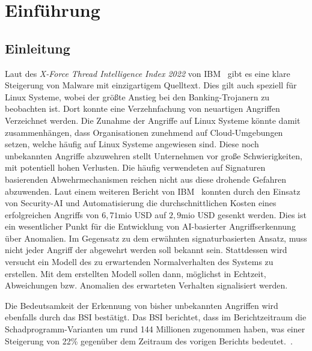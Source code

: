 \chapter{Einführung}\label{ch:introduction} %
\section{Einleitung}\label{sec:einleitung}
Laut des \textit{X-Force Thread Intelligence Index 2022} von IBM~\cite{IBM} gibt es eine klare Steigerung von Malware mit einzigartigem Quelltext.
Dies gilt auch speziell für Linux Systeme, wobei der größte Anstieg bei den Banking-Trojanern zu beobachten ist.
Dort konnte eine Verzehnfachung von neuartigen Angriffen Verzeichnet werden.
Die Zunahme der Angriffe auf Linux Systeme könnte damit zusammenhängen, dass Organisationen zunehmend auf Cloud-Umgebungen setzen, welche häufig auf Linux Systeme angewiesen sind.
Diese noch unbekannten Angriffe abzuwehren stellt Unternehmen vor große Schwierigkeiten, mit potentiell hohen Verlusten.
Die häufig verwendeten auf Signaturen basierenden Abwehrmechanismen reichen nicht aus diese drohende Gefahren abzuwenden.
Laut einem weiteren Bericht von IBM~\cite{IBM2} konnten durch den Einsatz von Security-\ac{AI} und Automatisierung die durchschnittlichen Kosten eines erfolgreichen Angriffs von $6,71$mio USD auf $2,9$mio USD gesenkt werden.
Dies ist ein wesentlicher Punkt für die Entwicklung von \ac{AI}-basierter Angriffserkennung über Anomalien.
Im Gegensatz zu dem erwähnten signaturbasierten Ansatz, muss nicht jeder Angriff der abgewehrt werden soll bekannt sein.
Stattdessen wird versucht ein Modell des zu erwartenden Normalverhalten des Systems zu erstellen.
Mit dem erstellten Modell sollen dann, möglichst in Echtzeit, Abweichungen bzw. Anomalien des erwarteten Verhalten signalisiert werden.

Die Bedeutsamkeit der Erkennung von bisher unbekannten Angriffen wird ebenfalls durch das \ac{BSI} bestätigt.
Das \ac{BSI} berichtet, dass im Berichtzeitraum die Schadprogramm-Varianten um rund 144 Millionen zugenommen haben, was einer Steigerung von 22\% gegenüber dem Zeitraum des vorigen Berichts bedeutet.~\cite{BSI}.

